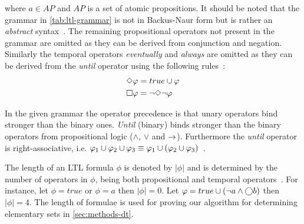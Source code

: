 

where $a \in AP$ and $AP$ is a set of atomic propositions. It should be noted that the grammar in \autoref{tab:ltl-grammar} is not in Backus-Naur form but is rather an \emph{abstract} syntax~\cite{baier2008principles}. The remaining propositional operators not present in the grammar are omitted as they can be derived from conjunction and negation. Similarly the temporal operators \emph{eventually} and \emph{always} are omitted as they can be derived from the \emph{until} operator using the following rules~\cite[pp.~232]{baier2008principles}:
\begin{align}
    &\Diamond \varphi = true \cup \varphi \label{eq:eventually} \\
    &\square \varphi = \lnot \Diamond \lnot \varphi \label{eq:always}
\end{align}

In the given grammar the operator precedence is that unary operators bind stronger than the binary ones. \emph{Until} (binary) binds stronger than the binary operators from propositional logic ($\land$, $\lor$ and $\rightarrow$). Furthermore the \emph{until} operator is right-associative, i.e. $\varphi_1 \cup \varphi_2 \cup \varphi_3 \equiv \varphi_1 \cup \left(\varphi_2 \cup \varphi_3\right)$~\cite{baier2008principles}.

The length of an LTL formula $\phi$ is denoted by $| \phi |$ and is determined by the number of operators in $\phi$, being both propositional and temporal operators~\cite{baier2008principles}. For instance, let $\phi= true$ or $\phi= a$ then $| \phi | = 0$. Let $\varphi= true \cup \left( \lnot a \land \bigcirc b \right)$ then $| \phi | = 4$. The length of formulae is used for proving our algorithm for determining elementary sets in \autoref{sec:methods-dt}.

